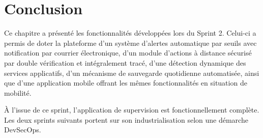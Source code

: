 \section*{Conclusion}
Ce chapitre a présenté les fonctionnalités développées lors du Sprint 2. Celui-ci a
permis de doter la plateforme d'un système d'alertes automatique par seuils avec
notification par courrier électronique, d'un module d'actions à distance sécurisé par
double vérification et intégralement tracé, d'une détection dynamique des services
applicatifs, d'un mécanisme de sauvegarde quotidienne automatisée, ainsi que d'une
application mobile offrant les mêmes fonctionnalités en situation de mobilité.

À l'issue de ce sprint, l'application de supervision est fonctionnellement complète. Les
deux sprints suivants portent sur son industrialisation selon une démarche DevSecOps.
